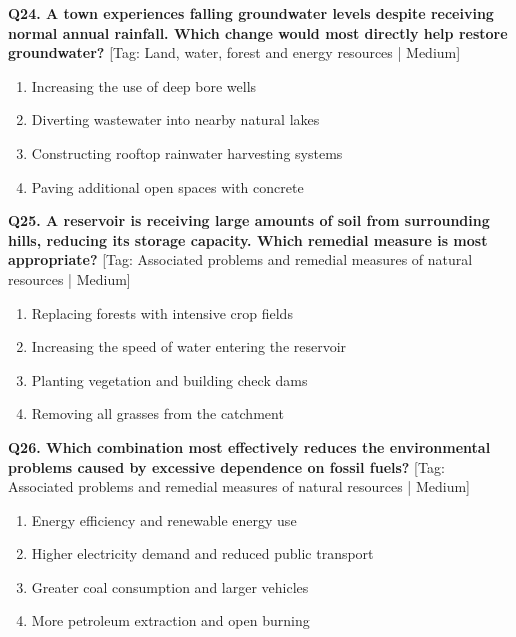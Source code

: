 \noindent\textbf{Q24. A town experiences falling groundwater levels despite receiving normal annual rainfall. Which change would most directly help restore groundwater?} \hfill [Tag: Land, water, forest and energy resources | Medium]
\begin{enumerate}[label=(\alph*),topsep=2pt,itemsep=1pt,partopsep=0pt,parsep=0pt]
    \item {Increasing the use of deep bore wells}
    \item {Diverting wastewater into nearby natural lakes}
    \item {Constructing rooftop rainwater harvesting systems}
    \item {Paving additional open spaces with concrete}
\end{enumerate}
\vspace{2mm}

\noindent\textbf{Q25. A reservoir is receiving large amounts of soil from surrounding hills, reducing its storage capacity. Which remedial measure is most appropriate?} \hfill [Tag: Associated problems and remedial measures of natural resources | Medium]
\begin{enumerate}[label=(\alph*),topsep=2pt,itemsep=1pt,partopsep=0pt,parsep=0pt]
    \item {Replacing forests with intensive crop fields}
    \item {Increasing the speed of water entering the reservoir}
    \item {Planting vegetation and building check dams}
    \item {Removing all grasses from the catchment}
\end{enumerate}
\vspace{2mm}

\noindent\textbf{Q26. Which combination most effectively reduces the environmental problems caused by excessive dependence on fossil fuels?} \hfill [Tag: Associated problems and remedial measures of natural resources | Medium]
\begin{enumerate}[label=(\alph*),topsep=2pt,itemsep=1pt,partopsep=0pt,parsep=0pt]
    \item {Energy efficiency and renewable energy use}
    \item {Higher electricity demand and reduced public transport}
    \item {Greater coal consumption and larger vehicles}
    \item {More petroleum extraction and open burning}
\end{enumerate}
\vspace{2mm}

